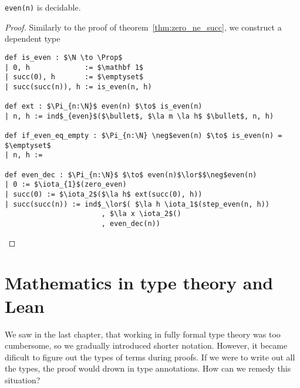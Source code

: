 \documentclass[a4paper, 12pt]{article}
\newcommand{\N}{\mathbb{N}}
\newcommand{\B}{\mathbb{B}}
\newcommand{\Prop}{\mathit{Prop}}
\renewcommand{\Prop}{\mathit{Prop}}
\newcommand{\la}[1]{\lambda{#1}.\,}
\theoremstyle{changedot}
\theoremstyle{changedotbreak}
\theoremstyle{nonumberplain}
\newtheorem{proof}{Proof}
\begin{document}





\begin{theorem}
  \lstinline{even(n)} is decidable.
\end{theorem}
\begin{proof}
  Similarly to the proof of theorem~\ref{thm:zero_ne_succ}, we construct a dependent type
\begin{lstlisting}
def is_even : $\N \to \Prop$
| 0, h             := $\mathbf 1$
| succ(0), h       := $\emptyset$
| succ(succ(n)), h := is_even(n, h)

def ext : $\Pi_{n:\N}$ even(n) $\to$ is_even(n)
| n, h := ind$_{even}$($\bullet$, $\la m \la h$ $\bullet$, n, h)

def if_even_eq_empty : $\Pi_{n:\N} \neg$even(n) $\to$ is_even(n) = $\emptyset$
| n, h := 

def even_dec : $\Pi_{n:\N}$ $\to$ even(n)$\lor$$\neg$even(n)
| 0 := $\iota_{1}$(zero_even)
| succ(0) := $\iota_2$($\la h$ ext(succ(0), h))
| succ(succ(n)) := ind$_\lor$( $\la h \iota_1$(step_even(n, h))
                       , $\la x \iota_2$()
                       , even_dec(n))
\end{lstlisting}
\end{proof}





\section{Mathematics in type theory and Lean}
We saw in the last chapter, that working in fully formal type theory was too cumbersome, so we gradually introduced shorter notation. However, it became dificult to figure out the types of terms during proofs. If we were to write out all the types, the proof would drown in type annotations. How can we remedy this situation?
\end{document}
